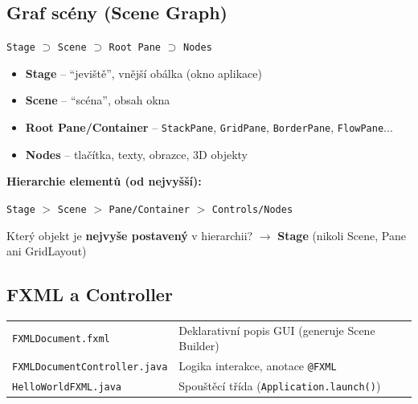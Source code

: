\documentclass[11pt,a4paper]{article}
\begin{document}
\subsection{Graf scény (Scene Graph)}

\begin{tcolorbox}[defbox,title=Struktura GUI JavaFX]
\begin{center}
\texttt{Stage} $\supset$ \texttt{Scene} $\supset$ \texttt{Root Pane} $\supset$ \texttt{Nodes}
\end{center}
\begin{itemize}
    \item \textbf{Stage} -- ``jeviště'', vnější obálka (okno aplikace)
    \item \textbf{Scene} -- ``scéna'', obsah okna
    \item \textbf{Root Pane/Container} -- \texttt{StackPane}, \texttt{GridPane}, \texttt{BorderPane}, \texttt{FlowPane}...
    \item \textbf{Nodes} -- tlačítka, texty, obrazce, 3D objekty
\end{itemize}
\end{tcolorbox}

\textbf{Hierarchie elementů (od nejvyšší):}
\begin{center}
\texttt{Stage} $>$ \texttt{Scene} $>$ \texttt{Pane/Container} $>$ \texttt{Controls/Nodes}
\end{center}

\begin{tcolorbox}[warnbox,title=Otázka ze vzorového testu!]
Který objekt je \textbf{nejvyše postavený} v hierarchii? $\rightarrow$ \textbf{Stage} (nikoli Scene, Pane ani GridLayout)
\end{tcolorbox}

\subsection{FXML a Controller}

\begin{tcolorbox}[defbox,title=Struktura FXML aplikace]
\begin{tabular}{ll}
\texttt{FXMLDocument.fxml} & Deklarativní popis GUI (generuje Scene Builder) \\
\texttt{FXMLDocumentController.java} & Logika interakce, anotace \texttt{@FXML} \\
\texttt{HelloWorldFXML.java} & Spouštěcí třída (\texttt{Application.launch()}) \\
\end{tabular}
\end{tcolorbox}
\end{document}
